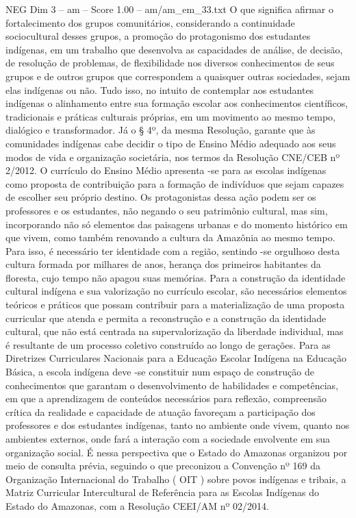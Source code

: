 \begin{textsample}{NEG Dim 3 – am – Score 1.00 – am/am\_em\_33.txt}
O que significa afirmar o fortalecimento dos grupos comunitários, considerando a continuidade sociocultural desses grupos, a promoção do protagonismo dos estudantes indígenas, em um trabalho que desenvolva as capacidades de análise, de decisão, de resolução de problemas, de flexibilidade nos diversos conhecimentos de seus grupos e de outros grupos que correspondem a quaisquer outras sociedades, sejam elas indígenas ou não.
Tudo isso, no intuito de contemplar aos estudantes indígenas o alinhamento entre sua formação escolar aos conhecimentos científicos, tradicionais e práticas culturais próprias, em um movimento ao mesmo tempo, dialógico e transformador.
Já o § 4º, da mesma Resolução, garante que às comunidades indígenas cabe decidir o tipo de Ensino Médio adequado aos seus modos de vida e organização societária, nos termos da Resolução CNE/CEB nº 2/2012.
O currículo do Ensino Médio apresenta -se para as escolas indígenas como proposta de contribuição para a formação de indivíduos que sejam capazes de escolher seu próprio destino.
Os protagonistas dessa ação podem ser os professores e os estudantes, não negando o seu patrimônio cultural, mas sim, incorporando não só elementos das paisagens urbanas e do momento histórico em que vivem, como também renovando a cultura da Amazônia ao mesmo tempo.
Para isso, é necessário ter identidade com a região, sentindo -se orgulhoso desta cultura formada por milhares de anos, herança dos primeiros habitantes da floresta, cujo tempo não apagou suas memórias.
Para a construção da identidade cultural indígena e sua valorização no currículo escolar, são necessários elementos teóricos e práticos que possam contribuir para a materialização de uma proposta curricular que atenda e permita a reconstrução e a construção da identidade cultural, que não está centrada na supervalorização da liberdade individual, mas é resultante de um processo coletivo construído ao longo de gerações.
Para as Diretrizes Curriculares Nacionais para a Educação Escolar Indígena na Educação Básica, a escola indígena deve -se constituir num espaço de construção de conhecimentos que garantam o desenvolvimento de habilidades e competências, em que a aprendizagem de conteúdos necessários para reflexão, compreensão crítica da realidade e capacidade de atuação favoreçam a participação dos professores e dos estudantes indígenas, tanto no ambiente onde vivem, quanto nos ambientes externos, onde fará a interação com a sociedade envolvente em sua organização social.
É nessa perspectiva que o Estado do Amazonas organizou por meio de consulta prévia, seguindo o que preconizou a Convenção nº 169 da Organização Internacional do Trabalho ( OIT ) sobre povos indígenas e tribais, a Matriz Curricular Intercultural de Referência para as Escolas Indígenas do Estado do Amazonas, com a Resolução CEEI/AM nº 02/2014.

\end{textsample}
